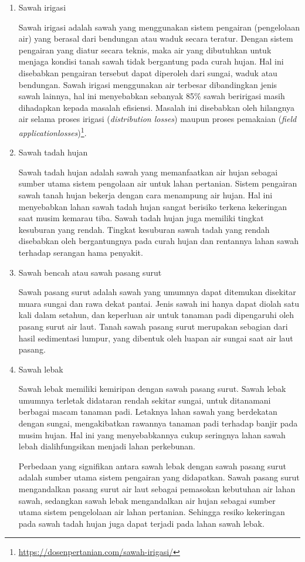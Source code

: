 \begin{enumerate}
\item{Sawah irigasi}

Sawah irigasi adalah sawah yang menggunakan sistem pengairan (pengelolaan air) yang berasal dari bendungan atau waduk secara teratur. Dengan sistem pengairan yang diatur secara teknis, maka air yang dibutuhkan untuk menjaga kondisi tanah sawah tidak bergantung pada curah hujan. Hal ini disebabkan pengairan tersebut dapat diperoleh dari sungai, waduk atau bendungan.
Sawah irigasi menggunakan air terbesar dibandingkan jenis sawah lainnya, hal ini menyebabkan sebanyak 85\% sawah beririgasi masih dihadapkan kepada masalah efisiensi. Masalah ini disebabkan oleh hilangnya air selama proses irigasi (\textit{distribution  losses}) maupun proses pemakaian (\textit{field  applicationlosses})\footnote{\url{https://dosenpertanian.com/sawah-irigasi/}}. 

\item{Sawah tadah hujan}

Sawah tadah hujan adalah sawah yang memanfaatkan air hujan sebagai sumber utama sistem pengolaan air untuk lahan pertanian. Sistem pengairan sawah tanah hujan bekerja dengan cara menampung air hujan. Hal ini menyebabkan lahan sawah tadah hujan sangat berisiko terkena kekeringan saat musim kemarau tiba. Sawah tadah hujan juga memiliki tingkat kesuburan yang rendah. Tingkat kesuburan sawah tadah yang rendah disebabkan oleh bergantungnya pada curah hujan dan rentannya lahan sawah terhadap serangan hama penyakit. 

\item{Sawah bencah atau sawah pasang surut}

Sawah pasang surut adalah sawah yang umumnya dapat ditemukan disekitar muara sungai dan rawa dekat pantai. Jenis sawah ini hanya dapat diolah satu kali dalam setahun, dan keperluan air untuk tanaman padi dipengaruhi oleh pasang surut air laut. Tanah sawah pasang surut merupakan sebagian dari hasil sedimentasi lumpur, yang dibentuk oleh luapan air sungai saat air laut pasang.

\item{Sawah lebak}

Sawah lebak memiliki kemiripan dengan sawah pasang surut. Sawah lebak umumnya terletak didataran rendah sekitar sungai, untuk ditanamani berbagai macam tanaman padi. Letaknya lahan sawah yang berdekatan dengan sungai, mengakibatkan rawannya tanaman padi terhadap banjir pada musim hujan. Hal ini yang menyebabkannya cukup seringnya lahan sawah lebah dialihfungsikan menjadi lahan perkebunan. 

Perbedaan yang signifikan antara sawah lebak dengan sawah pasang surut adalah sumber utama sistem pengairan yang didapatkan. Sawah pasang surut mengandalkan pasang surut air laut sebagai pemasokan kebutuhan air lahan sawah, sedangkan sawah lebak mengandalkan air hujan sebagai sumber utama sistem pengelolaan air lahan pertanian. Sehingga resiko kekeringan pada sawah tadah hujan juga dapat terjadi pada lahan sawah lebak. 
\end{enumerate}

